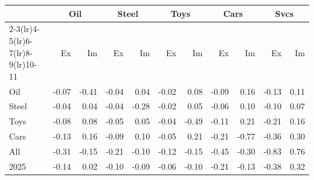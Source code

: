 \begin{tabular}{lrrrrrrrrrr}
\toprule
 & \multicolumn{2}{c}{Oil} & \multicolumn{2}{c}{Steel} & \multicolumn{2}{c}{Toys} & \multicolumn{2}{c}{Cars} & \multicolumn{2}{c}{Svcs} \\
\cmidrule(lr){2-3}\cmidrule(lr){4-5}\cmidrule(lr){6-7}\cmidrule(lr){8-9}\cmidrule(lr){10-11}
 & Ex & Im & Ex & Im & Ex & Im & Ex & Im & Ex & Im \\
\midrule
Oil & -0.07 & -0.41 & -0.04 & 0.04 & -0.02 & 0.08 & -0.09 & 0.16 & -0.13 & 0.11 \\
Steel & -0.04 & 0.04 & -0.04 & -0.28 & -0.02 & 0.05 & -0.06 & 0.10 & -0.10 & 0.07 \\
Toys & -0.08 & 0.08 & -0.05 & 0.05 & -0.04 & -0.49 & -0.11 & 0.21 & -0.21 & 0.16 \\
Cars & -0.13 & 0.16 & -0.09 & 0.10 & -0.05 & 0.21 & -0.21 & -0.77 & -0.36 & 0.30 \\
All & -0.31 & -0.15 & -0.21 & -0.10 & -0.12 & -0.15 & -0.45 & -0.30 & -0.83 & 0.76 \\
2025 & -0.14 & 0.02 & -0.10 & -0.09 & -0.06 & -0.10 & -0.21 & -0.13 & -0.38 & 0.32 \\
\bottomrule
\end{tabular}
